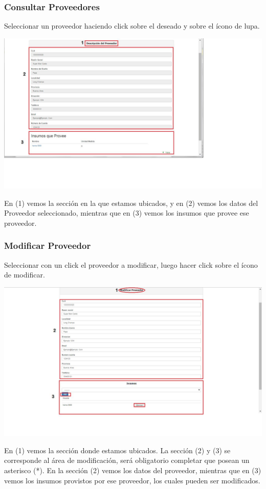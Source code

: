 \documentclass[letterpaper,10pt,english]{sphinxmanual}
\begin{document}
\subsubsection{Consultar Proveedores}
\label{proveedores:consultar-proveedores}
Seleccionar un proveedor haciendo click sobre el deseado y sobre el ícono de lupa.

\includegraphics{proveedor_detalle.jpg}

En (1) vemos la sección en la que estamos ubicados, y en (2) vemos los datos del Proveedor seleccionado, mientras que en (3) vemos los insumos que provee ese proveedor.


\subsubsection{Modificar Proveedor}
\label{proveedores:modificar-proveedor}
Seleccionar con un click el proveedor a modificar, luego hacer click sobre el ícono de modificar.

\includegraphics{proveedor_modificar.jpg}

En (1) vemos la sección donde estamos ubicados. La sección (2) y (3) se corresponde al área de modificación, será obligatorio completar que posean un asterisco (*).  En la sección (2) vemos los datos del proveedor, mientras que en (3) vemos los insumos provistos por ese proveedor, los cuales pueden ser modificados.
\end{document}

